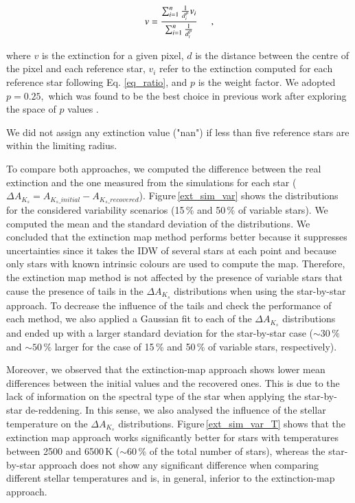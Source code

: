 \documentclass{aa}
\begin{document}
\begin{itemize}
\begin{equation}
v = \frac{\sum^n_{i=1}\frac{1}{d^p_i}v_i}{\sum^n_{i=1}\frac{1}{d^p_i}} \hspace{0.5cm},
\end{equation}
\vspace{0.2cm}


\noindent where $v$ is the extinction for a given pixel, $d$ is the distance between the centre of the pixel and each reference star, $v_i$ refer to the extinction computed for each reference star following Eq. \ref{eq_ratio}, and $p$ is the weight factor. We adopted $p=0.25,$ which was found to be the best choice in previous work after exploring the space of $p$ values \citep{Nogueras-Lara:2018aa, Nogueras-Lara:2018ab, Nogueras-Lara:2019ad}. 

We did not assign any extinction value ("nan") if less than five reference stars are within the limiting radius.



\end{itemize}

To compare both approaches, we computed the difference between the real extinction and the one measured from the simulations for each star ($\Delta A_{K_s}=A_{K_s\_initial}-A_{K_s\_recovered}$). Figure\,\ref{ext_sim_var} shows the distributions for the considered variability scenarios (15\,\% and 50\,\% of variable stars). We computed the mean and the standard deviation of the distributions. We concluded that the extinction map method performs better because it suppresses uncertainties since it takes the IDW of several stars at each point and because only stars with known intrinsic colours are used to compute the map. Therefore, the extinction map method is not affected by the presence of variable stars that cause the presence of tails in the $\Delta A_{K_s}$ distributions when using the star-by-star approach. To decrease the influence of the tails and check the performance of each method, we also applied a Gaussian fit to each of the $\Delta A_{K_s}$ distributions and ended up with a larger standard deviation for the star-by-star case ($\sim 30\,\%$ and $\sim50\,\%$ larger for the case of 15\,\% and 50\,\% of variable stars, respectively). 

Moreover, we observed that the extinction-map approach shows lower mean differences between the initial values and the recovered ones. This is due to the lack of information on the spectral type of the star when applying the star-by-star de-reddening. In this sense, we also analysed the influence of the stellar temperature on the $\Delta A_{K_s}$ distributions. Figure\,\ref{ext_sim_var_T} shows that the extinction map approach works significantly better for stars with temperatures between 2500 and 6500\,K ($\sim60$\,\% of the total number of stars), whereas the star-by-star approach does not show any significant difference when comparing different stellar temperatures and is, in general, inferior to the extinction-map approach.
\end{document}
